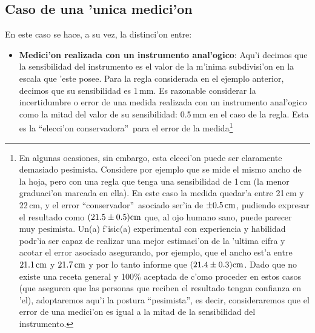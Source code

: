 \documentclass[letterpaper,11pt]{report}
\begin{document}
\subsection{Caso de una 'unica medici'on}
En este caso se hace, a su vez, la distinci'on entre:
\begin{itemize}
\item \textbf{Medici'on realizada con un instrumento anal'ogico}: Aqu'i decimos que la sensibilidad del instrumento es el valor de la m'inima subdivisi'on en la escala que 'este posee. Para la regla considerada en el ejemplo anterior, decimos que su sensibilidad es 1\,mm. Es razonable considerar la incertidumbre o error de una medida realizada con un instrumento anal'ogico como la mitad del valor de su sensibilidad: 0.5\,mm en el caso de la regla. Esta es la ``elecci'on conservadora''\, para el error de la medida\footnote{En algunas ocasiones, sin embargo, esta elecci'on puede ser claramente demasiado pesimista. Considere por ejemplo que se mide el mismo ancho de la hoja, pero con una regla que tenga una sensibilidad de 1\,cm (la menor graduaci'on marcada en ella). En este caso la medida quedar'a entre 21\,cm y 22\,cm, y el error ``conservador''\, asociado ser'ia de $\pm 0.5\,\rm cm$, pudiendo expresar el resultado como $(21.5\pm 0.5)\rm cm$ que, al ojo humano sano, puede parecer muy pesimista. Un(a) f'isic(a) experimental con experiencia y habilidad podr'ia ser capaz de realizar una mejor estimaci'on de la 'ultima cifra y acotar el error asociado asegurando, por ejemplo, que el ancho est'a entre $21.1\,\rm cm$ y $21.7\,\rm cm$ y por lo tanto informe que $(21.4\pm 0.3)\rm cm$. Dado que no existe una receta general y 100\% aceptada de c'omo proceder en estos casos (que aseguren que las personas que reciben el resultado tengan confianza en 'el), adoptaremos aqu'i la postura ``pesimista'', es decir, consideraremos que el error de una medici'on es igual a la mitad de la sensibilidad del instrumento.}


\end{itemize}
\end{document}
